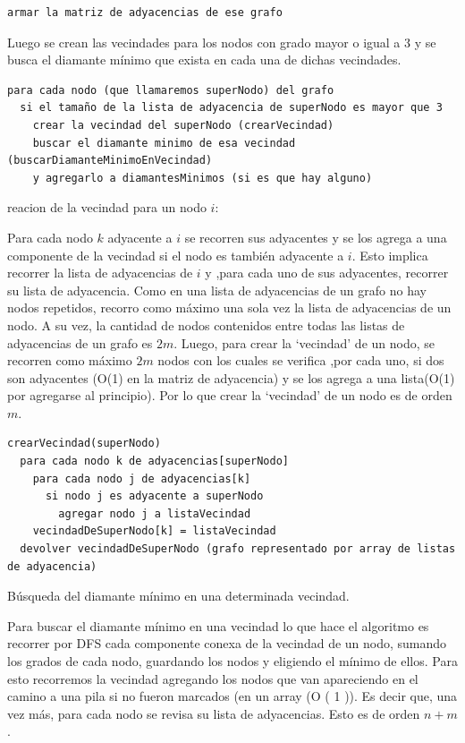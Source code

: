 \documentclass[a4paper,11pt] {article}
\begin{document}
\begin{verbatim}
armar la matriz de adyacencias de ese grafo
\end{verbatim}

Luego se crean las vecindades para los nodos con grado mayor o igual a 3 y se busca el diamante mínimo que exista en cada una de dichas vecindades.

\begin{verbatim}
para cada nodo (que llamaremos superNodo) del grafo
  si el tamaño de la lista de adyacencia de superNodo es mayor que 3
    crear la vecindad del superNodo (crearVecindad)
    buscar el diamante minimo de esa vecindad (buscarDiamanteMinimoEnVecindad)
    y agregarlo a diamantesMinimos (si es que hay alguno)
\end{verbatim}

reacion de la vecindad para un nodo $i$:

Para cada nodo $k$ adyacente a $i$ se recorren sus adyacentes y se los agrega a una componente de la vecindad si el nodo es también adyacente a $i$.
Esto implica recorrer la lista de adyacencias de $i$ y ,para cada uno de sus  adyacentes, recorrer su lista de adyacencia. Como en una lista de adyacencias de un grafo no hay nodos repetidos, recorro como máximo una sola vez la lista de adyacencias de un nodo. A su vez, la cantidad de nodos contenidos entre todas las listas de adyacencias de un grafo es $2m$.
Luego, para crear la ‘vecindad’ de un nodo, se recorren como máximo $2m$ nodos con los cuales se verifica ,por cada uno, si dos son adyacentes (O(1) en la matriz de adyacencia) y se los agrega a una lista(O(1) por agregarse al principio). Por lo que crear la ‘vecindad’ de un nodo es de orden $m$.

\begin{verbatim}
crearVecindad(superNodo)
  para cada nodo k de adyacencias[superNodo]
    para cada nodo j de adyacencias[k]
      si nodo j es adyacente a superNodo
        agregar nodo j a listaVecindad
    vecindadDeSuperNodo[k] = listaVecindad
  devolver vecindadDeSuperNodo (grafo representado por array de listas de adyacencia)
\end{verbatim}

Búsqueda del diamante mínimo en una determinada vecindad.

Para buscar el diamante mínimo en una vecindad lo que hace el algoritmo es recorrer por DFS cada componente conexa de la vecindad de un nodo,  sumando los grados de cada nodo, guardando los nodos y eligiendo el mínimo de ellos.
Para esto recorremos la vecindad agregando los nodos que van apareciendo en el camino a una pila si no fueron marcados (en un array (O ( 1 )). Es decir que, una vez más, para cada nodo se revisa su lista de adyacencias. Esto es de orden $n + m$.
\end{document}
